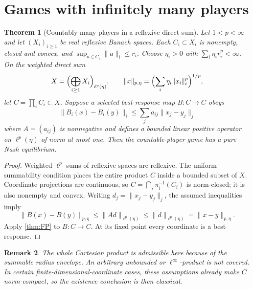 \documentclass[11pt]{article}
\newtheorem{theorem}{Theorem}[section]
\newtheorem{remark}[theorem]{Remark}
\theoremstyle{definition}\newtheorem{definition}[theorem]{Definition}
\begin{document}
\section{Games with infinitely many players}
\begin{theorem}[Countably many players in a reflexive direct sum\label{thm:countable}]
Let $1<p<\infty$ and let $(X_i)_{i\ge1}$ be real reflexive Banach spaces. Each $C_i\subset X_i$ is nonempty, closed and convex, and $\sup_{a\in C_i}\|a\|_i\le r_i$. Choose $\eta_i>0$ with $\sum_i\eta_i r_i^p<\infty$. On the weighted direct sum
\[X=\Bigl(\bigoplus_{i\ge1}X_i\Bigr)_{\ell^p(\eta)},\qquad
\|x\|_{p,\eta}=\Bigl(\sum_i\eta_i\|x_i\|_i^p\Bigr)^{1/p},\]
let $C=\prod_iC_i\subset X$. Suppose a selected best-response map $B:C\to C$ obeys
\[\|B_i(x)-B_i(y)\|_i\le\sum_j a_{ij}\|x_j-y_j\|_j\]
where $A=(a_{ij})$ is nonnegative and defines a bounded linear positive operator on $\ell^p(\eta)$ of norm at most one. Then the countable-player game has a pure Nash equilibrium.
\end{theorem}
\begin{proof}
Weighted $\ell^p$-sums of reflexive spaces are reflexive. The uniform summability condition places the entire product $C$ inside a bounded subset of $X$. Coordinate projections are continuous, so $C=\bigcap_i\pi_i^{-1}(C_i)$ is norm-closed; it is also nonempty and convex. Writing $d_j=\|x_j-y_j\|_j$, the assumed inequalities imply
\[\|B(x)-B(y)\|_{p,\eta}\le\|Ad\|_{\ell^p(\eta)}\le\|d\|_{\ell^p(\eta)}=\|x-y\|_{p,\eta}.\]
Apply \cref{thm:FP} to $B:C\to C$. At its fixed point every coordinate is a best response.
\end{proof}
\begin{remark}
The whole Cartesian product is admissible here because of the summable radius envelope. An arbitrary unbounded or $\ell^\infty$-product is not covered. In certain finite-dimensional-coordinate cases, these assumptions already make $C$ norm-compact, so the existence conclusion is then classical.
\end{remark}
\end{document}
